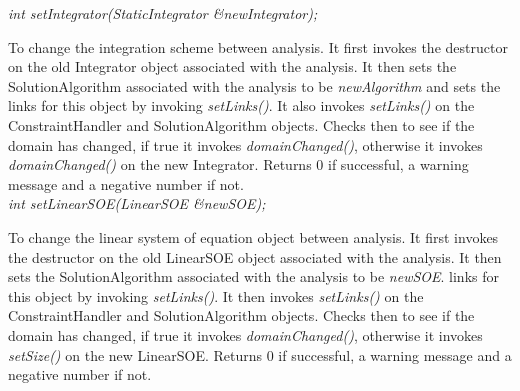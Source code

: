 {\em int setIntegrator(StaticIntegrator \&newIntegrator);}

To change the integration scheme between analysis. It first invokes the
destructor on the old Integrator object associated with the
analysis. It then sets the SolutionAlgorithm 
associated with the analysis to be {\em newAlgorithm} and sets the
links for this object by invoking {\em setLinks()}. It also invokes
{\em setLinks()} on the ConstraintHandler and SolutionAlgorithm
objects. Checks then to see if the domain has changed, if true it
invokes {\em domainChanged()}, otherwise it invokes {\em
domainChanged()} on the new Integrator. Returns $0$ if
successful, a warning message and a negative number if not.\\

{\em int setLinearSOE(LinearSOE \&newSOE);}

To change the linear system of equation object between analysis. It
first invokes the destructor on the old LinearSOE object associated
with the analysis. It then sets the SolutionAlgorithm 
associated with the analysis to be {\em newSOE}.
links for this object by invoking {\em setLinks()}. It then invokes
{\em setLinks()} on the ConstraintHandler and SolutionAlgorithm
objects. Checks then to see if the domain has changed, if true it
invokes {\em domainChanged()}, otherwise it invokes {\em
setSize()} on the new LinearSOE. Returns $0$ if successful, a warning
message and a negative number if not.\\ 


